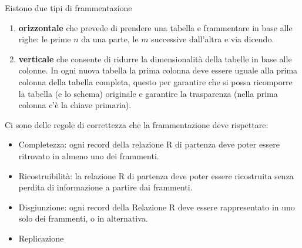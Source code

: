 Eistono due tipi di frammentazione
\begin{enumerate}
    \item \textbf{orizzontale} che prevede di prendere una tabella e frammentare in base alle righe: le prime $n$ da una parte, le $m$ successive dall'altra e via dicendo.
    \item \textbf{verticale} che consente di ridurre la dimensionalità della tabelle in base alle colonne. In ogni nuova tabella la prima colonna deve essere uguale alla prima colonna della tabella completa, questo per garantire che si possa ricomporre la tabella (e lo schema) originale e garantire la trasparenza (nella prima colonna c'è la chiave primaria).
\end{enumerate}

Ci sono delle regole di correttezza che la frammentazione deve rispettare:
\begin{itemize}
    \item Completezza: ogni record della relazione R di partenza deve poter essere ritrovato in almeno uno dei frammenti. 
    \item Ricostruibilità: la relazione R di partenza deve poter essere ricostruita senza perdita di informazione a partire dai frammenti. 
    \item Disgiunzione: ogni record della Relazione R deve essere rappresentato in uno solo dei frammenti, o in alternativa. 
    \item Replicazione
\end{itemize}

